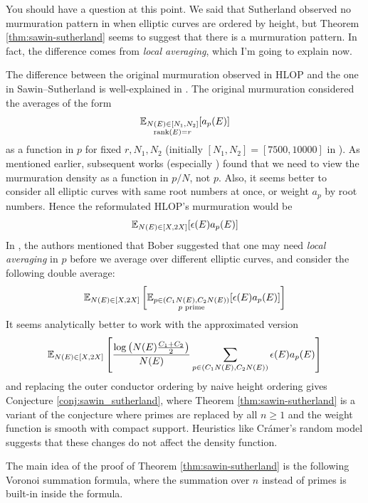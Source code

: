 You should have a question at this point.
We said that Sutherland observed no murmuration pattern in \cite{sutherlandletter} when elliptic curves are ordered by height, but Theorem \ref{thm:sawin-sutherland} seems to suggest that there is a murmuration pattern.
In fact, the difference comes from \emph{local averaging}, which I'm going to explain now.

The difference between the original murmuration observed in HLOP \cite{he2024murmurations} and the one in Sawin--Sutherland is well-explained in \cite[Section 1.1]{sawin2025murmurations}.
The original murmuration considered the averages of the form 
\[
\mathbb{E}_{\substack{N(E) \in [N_1, N_2] \\ \mathrm{rank}(E) = r}} [a_p(E)]
\]
as a function in $p$ for fixed $r, N_1, N_2$ (initially $[N_1, N_2] = [7500, 10000]$ in \cite{he2024murmurations}).
As mentioned earlier, subsequent works (especially \cite{sutherlandletter}) found that we need to view the murmuration density as a function in $p / N$, not $p$.
Also, it seems better to consider all elliptic curves with same root numbers at once, or weight $a_p$ by root numbers.
Hence the reformulated HLOP's murmuration would be
\begin{equation*}
    \mathbb{E}_{\substack{N(E) \in [X, 2X]}} [\epsilon(E) a_p(E)]
\end{equation*}
In \cite{sawin2025murmurations}, the authors mentioned that Bober suggested that one may need \emph{local averaging} in $p$ before we average over different elliptic curves, and consider the following double average:
\begin{equation*}
    \mathbb{E}_{N(E) \in [X, 2X]} \left[\mathbb{E}_{\substack{p \in (C_1 N(E), C_2 N(E)) \\ p \text{ prime}}} [\epsilon(E) a_p(E)]\right]
\end{equation*}
It seems analytically better to work with the approximated version
\[
\mathbb{E}_{N(E) \in [X, 2X]} \left[\frac{\log\left(N(E) \frac{C_1 + C_2}{2}\right)}{N(E)}\sum_{p \in (C_1 N(E), C_2 N(E))} \epsilon(E) a_p(E)\right]
\]
and replacing the outer conductor ordering by naive height ordering gives Conjecture \ref{conj:sawin_sutherland}, where Theorem \ref{thm:sawin-sutherland} is a variant of the conjecture where primes are replaced by all $n \ge 1$ and the weight function is smooth with compact support.
Heuristics like Cr\'amer's random model suggests that these changes do not affect the density function.

The main idea of the proof of Theorem \ref{thm:sawin-sutherland} is the following Voronoi summation formula, where the summation over $n$ instead of primes is built-in inside the formula.

